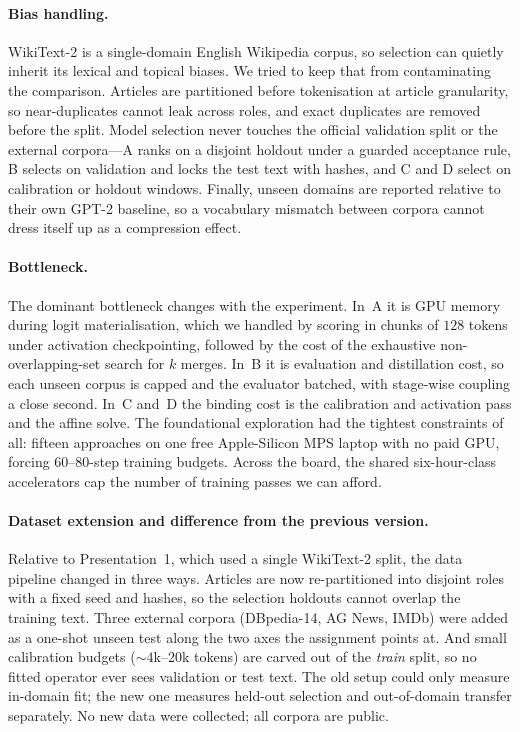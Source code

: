 \documentclass[10pt,a4paper]{article}
\begin{document}
\paragraph{Bias handling.} WikiText-2 is a single-domain English Wikipedia
corpus, so selection can quietly inherit its lexical and topical biases. We
tried to keep that from contaminating the comparison. Articles are partitioned
before tokenisation at article granularity, so near-duplicates cannot leak
across roles, and exact duplicates are removed before the split. Model
selection never touches the official validation split or the external
corpora---A ranks on a disjoint holdout under a guarded acceptance rule, B
selects on validation and locks the test text with hashes, and C and D select
on calibration or holdout windows. Finally, unseen domains are reported
relative to their own GPT-2 baseline, so a vocabulary mismatch between corpora
cannot dress itself up as a compression effect.

\paragraph{Bottleneck.} The dominant bottleneck changes with the experiment. In~A
it is GPU memory during logit materialisation, which we handled by scoring in
chunks of $128$ tokens under activation checkpointing, followed by the cost of
the exhaustive non-overlapping-set search for $k$ merges. In~B it is evaluation
and distillation cost, so each unseen corpus is capped and the evaluator
batched, with stage-wise coupling a close second. In~C and~D the binding cost is
the calibration and activation pass and the affine solve. The foundational
exploration had the tightest constraints of all: fifteen approaches on one free
Apple-Silicon MPS laptop with no paid GPU, forcing $60$--$80$-step training
budgets. Across the board, the shared six-hour-class accelerators cap the
number of training passes we can afford.

\paragraph{Dataset extension and difference from the previous version.}
Relative to Presentation~1, which used a single WikiText-2 split, the data
pipeline changed in three ways. Articles are now re-partitioned into disjoint
roles with a fixed seed and hashes, so the selection holdouts cannot overlap
the training text. Three external corpora (DBpedia-14, AG News, IMDb) were
added as a one-shot unseen test along the two axes the assignment points at.
And small calibration budgets (${\sim}4$k--$20$k tokens) are carved out of the
\emph{train} split, so no fitted operator ever sees validation or test text.
The old setup could only measure in-domain fit; the new one measures held-out
selection and out-of-domain transfer separately. No new data were collected;
all corpora are public.
\end{document}
